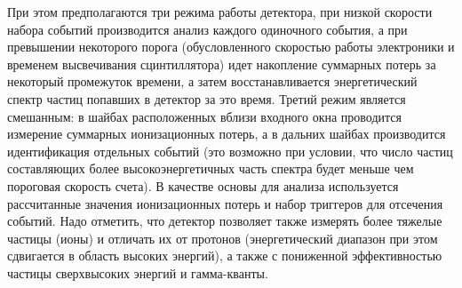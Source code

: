 При этом предполагаются три режима работы детектора, при низкой скорости набора событий производится анализ каждого одиночного события, а при превышении некоторого порога (обусловленного скоростью работы электроники и временем высвечивания сцинтиллятора) идет накопление суммарных потерь за некоторый промежуток времени, а затем восстанавливается энергетический спектр частиц попавших в детектор за это время. Третий режим является смешанным: в шайбах расположенных вблизи входного окна проводится измерение суммарных ионизационных потерь, а в дальних шайбах производится идентификация отдельных событий (это возможно при условии, что число частиц составляющих более высокоэнергетичных часть спектра будет меньше чем пороговая скорость счета). В качестве основы для анализа используется рассчитанные значения ионизационных потерь и набор триггеров для отсечения событий. Надо отметить, что детектор позволяет также измерять более тяжелые частицы (ионы) и отличать их от протонов (энергетический диапазон при этом сдвигается в область высоких энергий), а также с пониженной эффективностью частицы сверхвысоких энергий и гамма-кванты.

